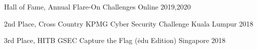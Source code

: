 



\begin{cvhonors}

  \cvhonor
    {Hall of Fame,} 
    {Annual Flare-On Challenges} 
    {Online} 
    {2019,2020}

  \cvhonor
    {2nd Place,} 
    {Cross Country KPMG Cyber Security Challenge} 
    {Kuala Lumpur} 
    {2018}

  \cvhonor
    {3rd Place,} 
    {HITB GSEC Capture the Flag (\.edu Edition)} 
    {Singapore} 
    {2018} 

\end{cvhonors}




